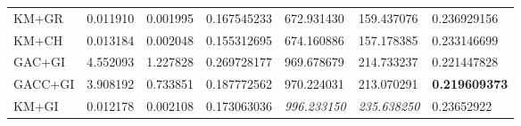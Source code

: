 \begin{table}[H]
\begin{tabular}{lllllll}
        KM+GR      & 0.011910                                                            & 0.001995                                                              & 0.167545233                                                                        & 672.931430          & 159.437076            & 0.236929156                       \\
        KM+CH      & 0.013184                                                            & 0.002048                                                              & 0.155312695                                                                        & 674.160886          & 157.178385            & 0.233146699                       \\
        GAC+GI     & 4.552093                                                            & 1.227828                                                              & 0.269728177                                                                        & 969.678679          & 214.733237            & 0.221447828                       \\
        GACC+GI    & 3.908192                                                            & 0.733851                                                              & 0.187772562                                                                        & 970.224031          & 213.070291            & \textbf{0.219609373}              \\
        KM+GI      & 0.012178                                                            & 0.002108                                                              & 0.173063036                                                                        & \textit{996.233150} & \textit{235.638250}   & 0.23652922
    \end{tabular}
\end{table}
